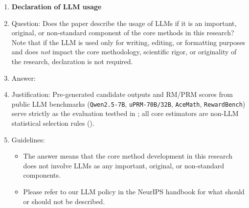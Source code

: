 \documentclass{article}
\theoremstyle{plain}
\theoremstyle{definition}
\theoremstyle{remark}
\begin{document}
\begin{enumerate}
\item {\bf Declaration of LLM usage}
    \item[] Question: Does the paper describe the usage of LLMs if it is an important, original, or non-standard component of the core methods in this research? Note that if the LLM is used only for writing, editing, or formatting purposes and does \emph{not} impact the core methodology, scientific rigor, or originality of the research, declaration is not required.
    \item[] Answer: \answerYes{}
    \item[] Justification: Pre-generated candidate outputs and RM/PRM scores from public LLM benchmarks (\texttt{Qwen2.5-7B}, \texttt{uPRM-70B/32B}, \texttt{AceMath}, \texttt{RewardBench}) serve strictly as the evaluation testbed in ; all core estimators are non-LLM statistical selection rules ().
    \item[] Guidelines:
    \begin{itemize}
        \item The answer \answerNA{} means that the core method development in this research does not involve LLMs as any important, original, or non-standard components.
        \item Please refer to our LLM policy in the NeurIPS handbook for what should or should not be described.
    \end{itemize}

\end{enumerate}
\end{document}
